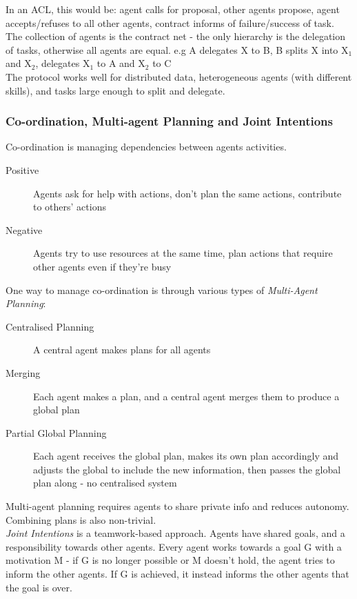 In an ACL, this would be: agent calls for proposal, other agents propose, agent accepts/refuses to all other agents, contract informs of failure/success of task.\\

The collection of agents is the contract net - the only hierarchy is the delegation of tasks, otherwise all agents are equal. e.g A delegates X to B, B splits X into X$_1$ and X$_2$, delegates X$_1$ to A and X$_2$ to C \\

The protocol works well for distributed data, heterogeneous agents (with different skills), and tasks large enough to split and delegate. 

\subsubsection{Co-ordination, Multi-agent Planning and Joint Intentions}
Co-ordination is managing dependencies between agents activities.
\begin{description}
    \item [Positive] Agents ask for help with actions, don't plan the same actions, contribute to others' actions
    \item[Negative] Agents try to use resources at the same time, plan actions that require other agents even if they're busy
\end{description}

One way to manage co-ordination is through various types of \emph{Multi-Agent Planning}: 
\begin{description}
    \item[Centralised Planning] A central agent makes plans for all agents
    \item[Merging] Each agent makes a plan, and a central agent merges them to produce a global plan
    \item[Partial Global Planning] Each agent receives the global plan, makes its own plan accordingly and adjusts the global to include the new information, then passes the global plan along - no centralised system
\end{description}
Multi-agent planning requires agents to share private info and reduces autonomy. Combining plans is also non-trivial.\\ 

\emph{Joint Intentions} is a teamwork-based approach. Agents have shared goals, and a responsibility towards other agents. Every agent works towards a goal G with a motivation M - if G is no longer possible or M doesn't hold, the agent tries to inform the other agents. If G is achieved, it instead informs the other agents that the goal is over. 

